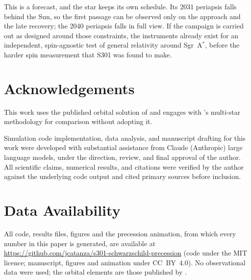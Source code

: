 \documentclass{aastex701}
\begin{document}
This is a forecast, and the star keeps its own schedule. Its 2031 periapsis falls behind the Sun, so the first passage can be observed only on the approach and the late recovery; the 2040 periapsis falls in full view. If the campaign is carried out as designed around those constraints, the instruments already exist for an independent, spin-agnostic test of general relativity around Sgr~A$^*$, before the harder spin measurement that S301 was found to make.

\section*{Acknowledgements}
This work uses the published orbital solution of \citet{gravity2026} and engages with \citet{piran2026}'s multi-star methodology for comparison without adopting it.

Simulation code implementation, data analysis, and manuscript drafting for this work were developed with substantial assistance from Claude (Anthropic) large language models, under the direction, review, and final approval of the author. All scientific claims, numerical results, and citations were verified by the author against the underlying code output and cited primary sources before inclusion.

\section*{Data Availability}
All code, results files, figures and the precession animation, from which every number in this paper is generated, are available at \url{https://github.com/jcatanza/s301-schwarzschild-precession} (code under the MIT licence; manuscript, figures and animation under CC~BY~4.0). No observational data were used; the orbital elements are those published by \citet{gravity2026}.



\end{document}
